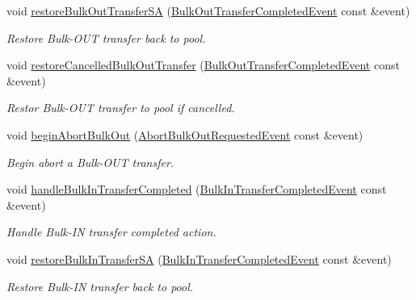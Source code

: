 \begin{DoxyCompactItemize}
void \hyperlink{structmdt_usbtmc_transfer_handler_state_machine_1_1_running___a299e3d26a8ac80e49e14dac52f2fb45f}{restore\-Bulk\-Out\-Transfer\-S\-A} (\hyperlink{structmdt_usbtmc_transfer_handler_state_machine_1_1_bulk_out_transfer_completed_event}{Bulk\-Out\-Transfer\-Completed\-Event} const \&event)
\begin{DoxyCompactList}\small\item\em Restore Bulk-\/\-O\-U\-T transfer back to pool. \end{DoxyCompactList}\item 
void \hyperlink{structmdt_usbtmc_transfer_handler_state_machine_1_1_running___a993fc53403ba9f2ab3202d6d17e021ae}{restore\-Cancelled\-Bulk\-Out\-Transfer} (\hyperlink{structmdt_usbtmc_transfer_handler_state_machine_1_1_bulk_out_transfer_completed_event}{Bulk\-Out\-Transfer\-Completed\-Event} const \&event)
\begin{DoxyCompactList}\small\item\em Restor Bulk-\/\-O\-U\-T transfer to pool if cancelled. \end{DoxyCompactList}\item 
void \hyperlink{structmdt_usbtmc_transfer_handler_state_machine_1_1_running___af4be1bad5cb9614f16f5b65a9111942f}{begin\-Abort\-Bulk\-Out} (\hyperlink{structmdt_usbtmc_transfer_handler_state_machine_1_1_abort_bulk_out_requested_event}{Abort\-Bulk\-Out\-Requested\-Event} const \&event)
\begin{DoxyCompactList}\small\item\em Begin abort a Bulk-\/\-O\-U\-T transfer. \end{DoxyCompactList}\item 
void \hyperlink{structmdt_usbtmc_transfer_handler_state_machine_1_1_running___a069cf28e48832118c8c056718d7766ef}{handle\-Bulk\-In\-Transfer\-Completed} (\hyperlink{structmdt_usbtmc_transfer_handler_state_machine_1_1_bulk_in_transfer_completed_event}{Bulk\-In\-Transfer\-Completed\-Event} const \&event)
\begin{DoxyCompactList}\small\item\em Handle Bulk-\/\-I\-N transfer completed action. \end{DoxyCompactList}\item 
void \hyperlink{structmdt_usbtmc_transfer_handler_state_machine_1_1_running___a44c7d636530d17a17293faac228629d5}{restore\-Bulk\-In\-Transfer\-S\-A} (\hyperlink{structmdt_usbtmc_transfer_handler_state_machine_1_1_bulk_in_transfer_completed_event}{Bulk\-In\-Transfer\-Completed\-Event} const \&event)
\begin{DoxyCompactList}\small\item\em Restore Bulk-\/\-I\-N transfer back to pool. \end{DoxyCompactList}\item 

\end{DoxyCompactItemize}
